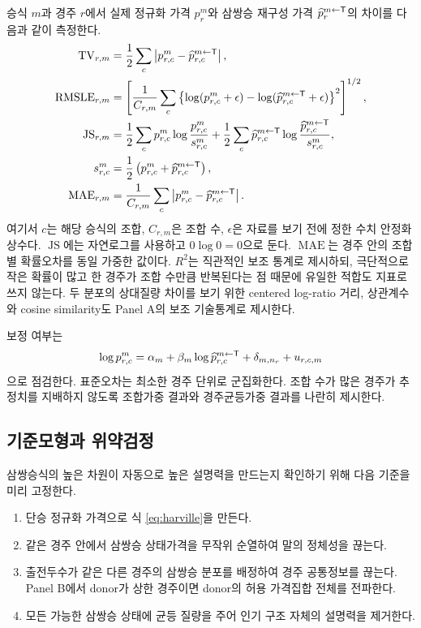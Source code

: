 승식 $m$과 경주 $r$에서 실제 정규화 가격 $p^m_r$와 삼쌍승 재구성 가격
$\widehat p^{m\leftarrow\mathsf{T}}_r$의 차이를 다음과 같이 측정한다.
\begin{align*}
  \operatorname{TV}_{r,m}
    &=\frac12\sum_c\left|p^m_{r,c}-
      \widehat p^{m\leftarrow\mathsf{T}}_{r,c}\right|,\\
  \operatorname{RMSLE}_{r,m}
    &=\left[\frac{1}{C_{r,m}}\sum_c
      \left\{\log(p^m_{r,c}+\epsilon)-
      \log(\widehat p^{m\leftarrow\mathsf{T}}_{r,c}+\epsilon)\right\}^2
      \right]^{1/2},\\
  \operatorname{JS}_{r,m}
    &=\frac12\sum_c p^m_{r,c}\log\frac{p^m_{r,c}}{s^m_{r,c}}
      +\frac12\sum_c \widehat p^{m\leftarrow\mathsf{T}}_{r,c}
       \log\frac{\widehat p^{m\leftarrow\mathsf{T}}_{r,c}}{s^m_{r,c}},\\
  s^m_{r,c}
    &=\frac12\left(p^m_{r,c}+\widehat p^{m\leftarrow\mathsf{T}}_{r,c}\right),\\
  \operatorname{MAE}_{r,m}
    &=\frac{1}{C_{r,m}}\sum_c
      \left|p^m_{r,c}-\widehat p^{m\leftarrow\mathsf{T}}_{r,c}\right|.
\end{align*}
여기서 $c$는 해당 승식의 조합, $C_{r,m}$은 조합 수, $\epsilon$은 자료를 보기
전에 정한 수치 안정화 상수다. $\operatorname{JS}$에는 자연로그를 사용하고
$0\log 0=0$으로 둔다. $\operatorname{MAE}$는 경주 안의 조합별 확률오차를
동일 가중한 값이다. $R^2$는 직관적인 보조 통계로 제시하되, 극단적으로 작은
확률이 많고 한 경주가 조합 수만큼 반복된다는 점 때문에 유일한 적합도 지표로
쓰지 않는다. 두 분포의 상대질량 차이를 보기 위한 centered log-ratio 거리,
상관계수와 cosine similarity도 Panel A의 보조 기술통계로 제시한다.

보정 여부는
\begin{equation}
  \log p^m_{r,c}
  =\alpha_m+\beta_m
   \log\widehat p^{m\leftarrow\mathsf{T}}_{r,c}
   +\delta_{m,n_r}+u_{r,c,m}
  \label{eq:calibration}
\end{equation}
으로 점검한다. 표준오차는 최소한 경주 단위로 군집화한다. 조합 수가 많은 경주가
추정치를 지배하지 않도록 조합가중 결과와 경주균등가중 결과를 나란히 제시한다.

\subsection{기준모형과 위약검정}

삼쌍승식의 높은 차원이 자동으로 높은 설명력을 만드는지 확인하기 위해 다음
기준을 미리 고정한다.

\begin{enumerate}
  \item 단승 정규화 가격으로 식 \eqref{eq:harville}을 만든다.
  \item 같은 경주 안에서 삼쌍승 상태가격을 무작위 순열하여 말의 정체성을 끊는다.
  \item 출전두수가 같은 다른 경주의 삼쌍승 분포를 배정하여 경주 공통정보를 끊는다.
    Panel B에서 donor가 상한 경주이면 donor의 허용 가격집합 전체를 전파한다.
  \item 모든 가능한 삼쌍승 상태에 균등 질량을 주어 인기 구조 자체의 설명력을 제거한다.
\end{enumerate}

